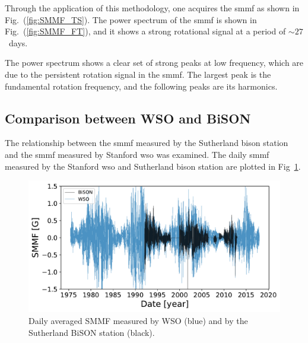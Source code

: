 Through the application of this methodology, one acquires the \gls{smmf} as shown in Fig.~(\ref{fig:SMMF_TS}). The power spectrum of the \gls{smmf} is shown in Fig.~(\ref{fig:SMMF_FT}), and it shows a strong rotational signal at a period of $\sim27$~days. 



The power spectrum shows a clear set of strong peaks at low frequency, which are due to the persistent rotation signal in the \gls{smmf}. The largest peak is the fundamental rotation frequency, and the following peaks are its harmonics.


\subsection{Comparison between WSO and BiSON}

The relationship between the \gls{smmf} measured by the Sutherland \gls{bison} station and the \gls{smmf} measured by Stanford \gls{wso} was examined. The daily \gls{smmf} measured by the Stanford \gls{wso} and Sutherland \gls{bison} station are plotted in Fig~\ref{fig:BiSON_and_WSO}.

\begin{figure}[ht!]
    \centering
	\includegraphics[width=\columnwidth]{BiSON_and_WSO.pdf}
    \caption{Daily averaged SMMF measured by WSO (blue) and by the Sutherland BiSON station (black).}
    \label{fig:BiSON_and_WSO}
\end{figure}

